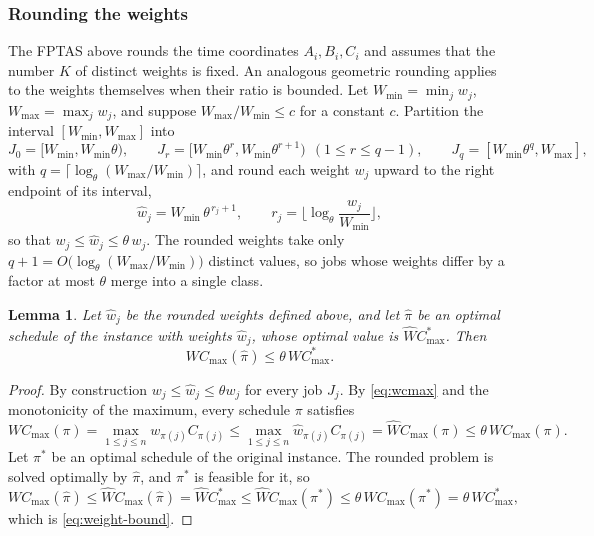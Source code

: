 \documentclass[12pt]{article}
\newtheorem{lemma}{Lemma}[section]
\begin{document}
\begin{sloppypar}
        \subsubsection{Rounding the weights}
        \label{subsub:fptas-weight}
        
        The FPTAS above rounds the time coordinates $A_i,B_i,C_i$ and assumes that the number $K$ of
        distinct weights is fixed. An analogous geometric rounding applies to the weights themselves when
        their ratio is bounded. Let $W_{\min}=\min_{j}w_j$, $W_{\max}=\max_{j}w_j$, and suppose
        $W_{\max}/W_{\min}\le c$ for a constant $c$. Partition the interval $[W_{\min},W_{\max}]$ into
        \[
        J_0=[W_{\min},W_{\min}\theta),\qquad
        J_r=[W_{\min}\theta^{r},W_{\min}\theta^{r+1})\ \ (1\le r\le q-1),\qquad
        J_q=[W_{\min}\theta^{q},W_{\max}],
        \]
        with $q=\big\lceil\log_\theta(W_{\max}/W_{\min})\big\rceil$, and round each weight $w_j$ upward to
        the right endpoint of its interval,
        \[
        \hat w_j=W_{\min}\,\theta^{\,r_j+1},\qquad
        r_j=\Big\lfloor\log_\theta\frac{w_j}{W_{\min}}\Big\rfloor,
        \]
        so that $w_j\le\hat w_j\le\theta\,w_j$. The rounded weights take only
        $q+1=O\big(\log_\theta(W_{\max}/W_{\min})\big)$ distinct values, so jobs whose weights differ by a
        factor at most $\theta$ merge into a single class.
        
        \begin{lemma}\label{lem:weight-approx}
            Let $\hat w_j$ be the rounded weights defined above, and let $\hat\pi$ be an optimal schedule of
            the instance with weights $\hat w_j$, whose optimal value is $\hat W C_{\max}^{*}$. Then
            \begin{equation}\label{eq:weight-bound}
                W C_{\max}(\hat\pi)\le\theta\,W C_{\max}^{*}.
            \end{equation}
        \end{lemma}
        
        \begin{proof}
            By construction $w_j\le\hat w_j\le\theta w_j$ for every job $J_j$. By \cref{eq:wcmax} and the
            monotonicity of the maximum,
            every schedule $\pi$ satisfies
            \[
            W C_{\max}(\pi)=\max_{1\le j\le n}w_{\pi(j)} C_{\pi(j)}
            \le\max_{1\le j\le n}\hat w_{\pi(j)} C_{\pi(j)}=\hat W C_{\max}(\pi)
            \le\theta\,W C_{\max}(\pi).
            \]
            Let $\pi^{*}$ be an optimal schedule of the original instance. The rounded problem is solved
            optimally by $\hat\pi$, and $\pi^{*}$ is feasible for it, so
            \[
            W C_{\max}(\hat\pi)\le\hat W C_{\max}(\hat\pi)=\hat W C_{\max}^{*}
            \le\hat W C_{\max}(\pi^{*})\le\theta\,W C_{\max}(\pi^{*})=\theta\,W C_{\max}^{*},
            \]
            which is \cref{eq:weight-bound}.
        \end{proof}
        

\end{sloppypar}
\end{document}
